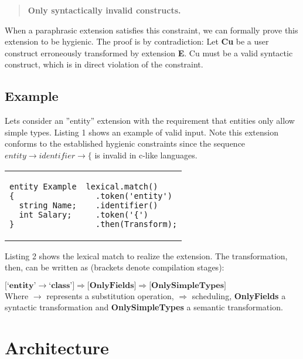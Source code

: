 \documentclass[conference]{IEEEtran}
\begin{document}
\begin{quotation}
{\textbf{Only syntactically invalid constructs.}}
\end{quotation}

When a paraphrasic extension satisfies this constraint, we can formally prove this extension to be hygienic. 
The proof is by contradiction: Let \textbf{Cu} be a user construct erroneously transformed by extension \textbf{E}. 
Cu must be a valid syntactic construct, which is in direct violation of the constraint.

\subsection{Example}
Lets consider an ''entity'' extension with the requirement that  entities only allow simple types. Listing 1 shows an example of valid input. 
Note this extension conforms to the established hygienic constraints since the sequence
$entity \rightarrow  identifier \rightarrow  \{$ is invalid in c-like languages.

\begin{tabular}{p{3.3cm}|p{4.8cm}}
\begin{lstlisting}[caption=Example, captionpos= b]
entity Example
{
  string Name;
  int Salary;
}
\end{lstlisting}
&

\begin{lstlisting}[caption=Implementation, captionpos= b]
lexical.match()
  .token('entity')
  .identifier()
  .token('{')
  .then(Transform);

\end{lstlisting}
\end{tabular}

Listing 2 shows the lexical match to realize the extension. The transformation, then, can be written as (brackets denote compilation stages):

{\small\begin{math} 
	\big\lbrack \textbf{`entity'} \rightarrow \textbf{`class'} \big\rbrack \Rightarrow 
	 \big\lbrack \textbf{OnlyFields} \big\rbrack  \Rightarrow  
	 \big\lbrack \textbf{OnlySimpleTypes} \big\rbrack  
\end{math}} \\

Where $\rightarrow$ represents a substitution operation, $\Rightarrow$ scheduling, \textbf{OnlyFields} a syntactic transformation and \textbf{OnlySimpleTypes} a semantic transformation.

\section{Architecture}
\end{document}
